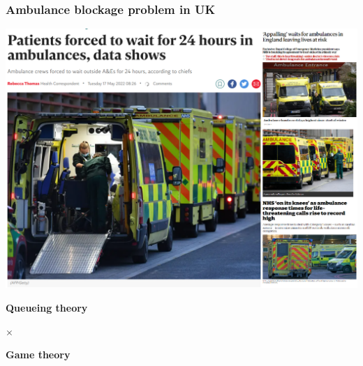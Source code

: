 \begin{frame}
    \frametitle{Ambulance blockage problem in UK}
    \centering

    \includegraphics[scale=0.3]{Bin/ambulance_pics/articles.PNG}
        
\end{frame}



\begin{frame}
    \Huge
    \centering

    \textbf{Queueing theory}

    \(\times\)

    \textbf{Game theory}
    
\end{frame}
